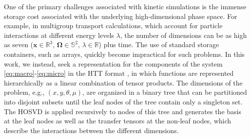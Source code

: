 \documentclass[onefignum,onetabnum]{siamart220329}
\begin{document}
One of the primary challenges associated with kinetic simulations is the immense storage cost associated with the underlying high-dimensional phase space. For example, in multigroup transport calculations, which account for particle interactions at different energy levels $\lambda$, the number of dimensions can be as high as seven ($\mathbf{x} \in \mathbb{R}^{3}$, $\mathbf{\Omega} \in \mathbb{S}^{2}$, $\lambda \in \mathbb{R}$) plus time. The use of standard storage containers, such as arrays, quickly become impractical for such problems. In this work, we instead, seek a representation for the components of the system \eqref{eq:macro}-\eqref{eq:micro} in the HTT format \cite{HackbuschKuhnHT2009,GrasedyckHTT2010}, in which functions are represented hierarchically as a linear combination of tensor products. The dimensions of the problem, e.g., $(x,y,\theta,\mu)$, are organized in a binary tree that can be partitioned into disjoint subsets until the leaf nodes of the tree contain only a singleton set. The HOSVD \cite{DeLathauwerHOSVD2000} is applied recursively to nodes of this tree and generates the basis at the leaf nodes as well as the transfer tensors at the non-leaf nodes, which describe the interactions between the different dimensions. 
\end{document}
